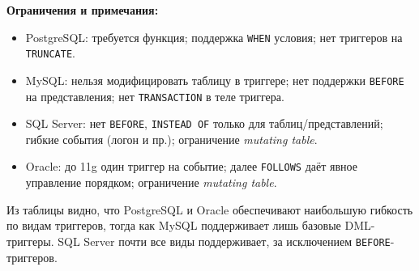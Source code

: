 \vspace{0.5em}

\noindent\textbf{Ограничения и примечания:}

\begin{itemize}
    \item PostgreSQL: требуется функция; поддержка \texttt{WHEN} условия; нет триггеров на \texttt{TRUNCATE}.
    \item MySQL: нельзя модифицировать таблицу в триггере; нет поддержки \texttt{BEFORE} на представления; нет \texttt{TRANSACTION} в теле триггера.
    \item SQL Server: нет \texttt{BEFORE}, \texttt{INSTEAD OF} только для таблиц/представлений; гибкие события (логон и пр.); ограничение \textit{mutating table}.
    \item Oracle: до 11g один триггер на событие; далее \texttt{FOLLOWS} даёт явное управление порядком; ограничение \textit{mutating table}.
\end{itemize}

\vspace{0.5em}

Из таблицы видно, что PostgreSQL и Oracle обеспечивают наибольшую гибкость по видам триггеров, тогда как MySQL поддерживает лишь базовые DML-триггеры. SQL Server почти все виды поддерживает, за исключением \texttt{BEFORE}-триггеров.

